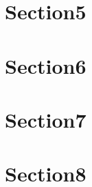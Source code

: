 \documentclass{llncs}
\begin{document}
\section{Section5}


\section{Section6}

	
\section{Section7}

	
\section{Section8}


\begin{thebibliography}{}
\end{thebibliography}
\end{document}
